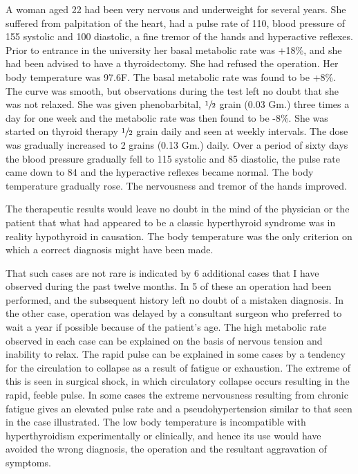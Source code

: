 \documentclass[10pt, letterpaper]{memoir}
\begin{document}
\begin{multicols}{2}
\begin{center}
\begin{minipage}{0.95\columnwidth}
\hspace*{1em}\small A woman aged 22 had been very nervous and underweight for several years. She suffered from palpitation of the heart, had a pulse rate of 110, blood pressure of 155 systolic and 100 diastolic, a fine tremor of the hands and hyperactive reflexes. Prior to entrance in the university her basal metabolic rate was +18\%, and she had been advised to have a thyroidectomy. She had refused the operation. Her body temperature was 97.6\textdegree{}F. The basal metabolic rate was found to be +8\%. The curve was smooth, but observations during the test left no doubt that she was not relaxed. She was given phenobarbital, $\sfrac{1}{2}$ grain (0.03 Gm.) three times a day for one week and the metabolic rate was then found to be -8\%. She was started on thyroid therapy $\sfrac{1}{2}$ grain daily and seen at weekly intervals. The dose was gradually increased to 2 grains (0.13 Gm.) daily. Over a period of sixty days the blood pressure gradually fell to 115 systolic and 85 diastolic, the pulse rate came down to 84 and the hyperactive reflexes became normal. The body temperature gradually rose. The nervousness and tremor of the hands improved.
\end{minipage}
\end{center}

The therapeutic results would leave no doubt in the mind of the physician or the patient that what had appeared to be a classic hyperthyroid syndrome was in reality hypothyroid in causation. The body temperature was the only criterion on which a correct diagnosis might have been made.

That such cases are not rare is indicated by 6 additional cases that I have observed during the past twelve months. In 5 of these an operation had been performed, and the subsequent history left no doubt of a mistaken diagnosis. In the other case, operation was delayed by a consultant surgeon who preferred to wait a year if possible because of the patient's age. The high metabolic rate observed in each case can be explained on the basis of nervous tension and inability to relax. The rapid pulse can be explained in some cases by a tendency for the circulation to collapse as a result of fatigue or exhaustion. The extreme of this is seen in surgical shock, in which circulatory collapse occurs resulting in the rapid, feeble pulse. In some cases the extreme nervousness resulting from chronic fatigue gives an elevated pulse rate and a pseudohypertension similar to that seen in the case illustrated. The low body temperature is incompatible with hyperthyroidism experimentally or clinically, and hence its use would have avoided the wrong diagnosis, the operation and the resultant aggravation of symptoms.


\end{multicols}
\end{document}
